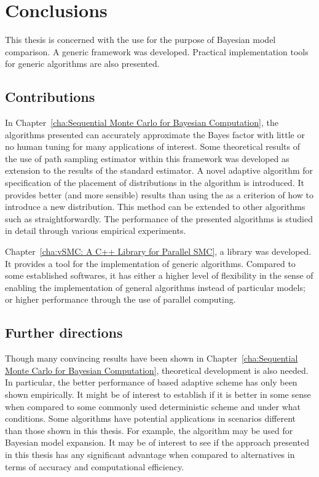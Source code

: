 \chapter{Conclusions}
\label{cha:Conclusions}

This thesis is concerned with the use \smc for the purpose of Bayesian model
comparison. A generic framework was developed. Practical implementation tools
for generic \smc algorithms are also presented.

\section{Contributions}
\label{sec:Contributions}

In Chapter~\ref{cha:Sequential Monte Carlo for Bayesian Computation}, the
algorithms presented can accurately approximate the Bayes factor with little
or no human tuning for many applications of interest. Some theoretical results
of the use of path sampling estimator within this framework was developed as
extension to the results of the standard estimator. A novel adaptive algorithm
for specification of the placement of distributions in the \smc[2] algorithm
is introduced. It provides better (and more sensible) results than using the
\ess as a criterion of how to introduce a new distribution. This method can be
extended to other algorithms such as \smc[3] straightforwardly. The
performance of the presented algorithms is studied in detail through various
empirical experiments.

Chapter~\ref{cha:vSMC: A C++ Library for Parallel SMC}, a \cpp library was
developed. It provides a tool for the implementation of generic \smc
algorithms. Compared to some established softwares, it has either a higher
level of flexibility in the sense of enabling the implementation of general
algorithms instead of particular models; or higher performance through the use
of parallel computing.

\section{Further directions}
\label{sec:Further directions}

Though many convincing results have been shown in Chapter~\ref{cha:Sequential
  Monte Carlo for Bayesian Computation}, theoretical development is also
needed. In particular, the better performance of \cess based adaptive scheme
has only been shown empirically. It might be of interest to establish if it is
better in some sense when compared to some commonly used deterministic
scheme and under what conditions. Some algorithms have potential applications
in scenarios different than those shown in this thesis. For example, the
\smc[3] algorithm may be used for Bayesian model expansion. It may be of
interest to see if the approach presented in this thesis has any significant
advantage when compared to alternatives in terms of accuracy and computational
efficiency.


